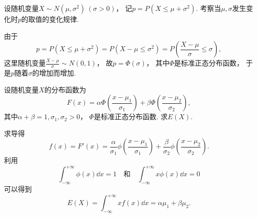 \begin{example}
设随机变量\(X \sim N(\mu,\sigma^2)\ (\sigma>0)\)，
记\(p = P(X \leq \mu + \sigma^2)\).
考察当\(\mu,\sigma\)发生变化时\(p\)的取值的变化规律.
\begin{solution}
由于\[
	p = P(X \leq \mu + \sigma^2)
	= P(X - \mu \leq \sigma^2)
	= P\left( \frac{X-\mu}\sigma \leq \sigma \right),
\]
这里随机变量\(\frac{X-\mu}\sigma \sim N(0,1)\)，
故\(p = \Phi(\sigma)\)，
其中\(\Phi\)是标准正态分布函数，
于是\(p\)随着\(\sigma\)的增加而增加.
\end{solution}
\end{example}

\begin{example}
设随机变量\(X\)的分布函数为\[
	F(x) = \alpha \Phi\left( \frac{x-\mu_1}{\sigma_1} \right)
	+ \beta \Phi\left( \frac{x-\mu_2}{\sigma_2} \right),
\]
其中\(\alpha+\beta=1,
\sigma_1,\sigma_2>0\)，
\(\Phi\)是标准正态分布函数.
求\(E(X)\).
\begin{solution}
求导得\[
	f(x) = F'(x)
	= \frac{\alpha}{\sigma_1} \phi\left( \frac{x-\mu_1}{\sigma_1} \right)
	+ \frac{\beta}{\sigma_2} \phi\left( \frac{x-\mu_2}{\sigma_2} \right).
\]
利用\[
	\int_{-\infty}^{+\infty} \phi(x) \dd{x} = 1
	\quad\text{和}\quad
	\int_{-\infty}^{+\infty} x \phi(x) \dd{x} = 0
\]
可以得到\[
	E(X) = \int_{-\infty}^{+\infty} x f(x) \dd{x}
	= \alpha \mu_1 + \beta \mu_2.
\]
\end{solution}
\end{example}
